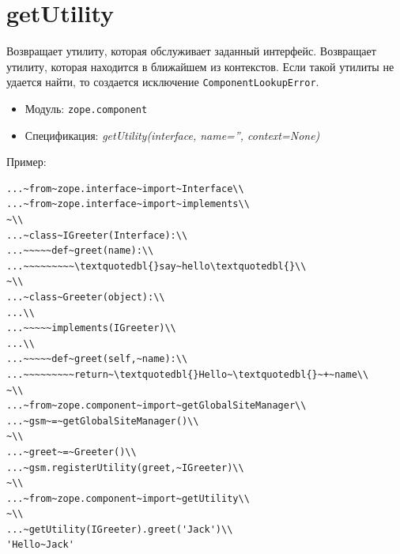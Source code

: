 \documentclass[a4paper,openany,twoside,draft]{book}
\providecommand*{\DUroletitlereference}[1]{\textsl{#1}}
\begin{document}
\section*{getUtility%
  \label{getutility}%
}

Возвращает утилиту, которая обслуживает заданный интерфейс.
Возвращает утилиту, которая находится в ближайшем из контекстов.  Если
такой утилиты не удается найти, то создается исключение
\texttt{ComponentLookupError}.

\begin{itemize}

\item Модуль: \texttt{zope.component}

\item Спецификация: \DUroletitlereference{getUtility(interface, name='', context=None)}

\end{itemize}

Пример:

\begin{verbatim}
...~from~zope.interface~import~Interface\\
...~from~zope.interface~import~implements\\
~\\
...~class~IGreeter(Interface):\\
...~~~~~def~greet(name):\\
...~~~~~~~~~\textquotedbl{}say~hello\textquotedbl{}\\
~\\
...~class~Greeter(object):\\
...\\
...~~~~~implements(IGreeter)\\
...\\
...~~~~~def~greet(self,~name):\\
...~~~~~~~~~return~\textquotedbl{}Hello~\textquotedbl{}~+~name\\
~\\
...~from~zope.component~import~getGlobalSiteManager\\
...~gsm~=~getGlobalSiteManager()\\
~\\
...~greet~=~Greeter()\\
...~gsm.registerUtility(greet,~IGreeter)\\
~\\
...~from~zope.component~import~getUtility\\
~\\
...~getUtility(IGreeter).greet('Jack')\\
'Hello~Jack'
\end{verbatim}
\end{document}
